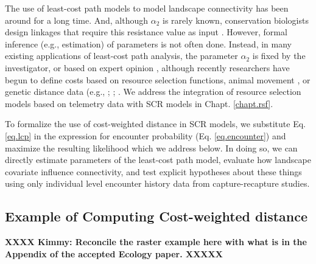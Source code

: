 The use of least-cost path models to model landscape connectivity has
been around for a long time. And, although $\alpha_{2}$ is rarely
known, conservation biologists design linkages that require this
resistance value as input \citep[see][and articles cited
therein]{beier_etal:2008}.  However, formal inference (e.g.,
estimation) of parameters is not often done.  Instead, in many
existing applications of least-cost path analysis, the parameter
$\alpha_{2}$ is fixed by the investigator, or based on expert opinion
\citep{beier_etal:2008}, although recently researchers have begun to
define costs based on resource selection functions, animal movement
\citep{tracy:2006, fortin_etal:2005}, or genetic distance data (e.g.,
\citet{gerlach_musolf:2000}; \citet{epps_etal:2007};
\citet{schwartz_etal:2009}. We address the integration of resource
selection models based on telemetry data with SCR models in
Chapt. \ref{chapt.rsf}.


To formalize the use of cost-weighted distance in SCR models, we
substitute Eq. \ref{eq.lcp} in the expression for encounter
probability (Eq. \ref{eq.encounter}) and maximize the resulting
likelihood which we address below. In doing so, we can directly
estimate parameters of the least-cost path model, evaluate how
landscape covariate influence connectivity, and test explicit hypotheses
about these things using only individual level encounter history data
from capture-recapture studies.


\subsection{Example of Computing Cost-weighted distance}


{\bf XXXX Kimmy: Reconcile the raster example here with what is in the
  Appendix of the accepted Ecology paper. XXXXX}

